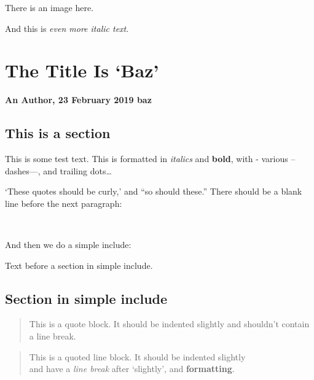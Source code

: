 \documentclass[
  12pt,
  a4paper,
]{article}
\begin{document}
\makeatletter
\@afterindentfalse
\@afterheading
\makeatother

There is an image here.

And this is \emph{even more italic text}.

\hypertarget{__h1_3}{%
\section{The Title Is `Baz'}\label{__h1_3}}

\makeatletter
\@afterindentfalse
\@afterheading
\makeatother

\textbf{An Author, 23 February 2019 baz}

\hypertarget{__h2_4}{%
\subsection{This is a section}\label{__h2_4}}

\makeatletter
\@afterindentfalse
\@afterheading
\makeatother

This is some test text. This is formatted in \emph{italics} and
\textbf{bold}, with - various -- dashes---, and trailing dots\ldots{}

`These quotes should be curly,' and ``so should these.'' There should be
a blank line before the next paragraph:

~

\makeatletter
\@afterindentfalse
\@afterheading
\makeatother

And then we do a simple include:

Text before a section in simple include.

\hypertarget{__h2_5}{%
\subsection{Section in simple include}\label{__h2_5}}

\begin{quote}
This is a quote block. It should be indented slightly and shouldn't
contain a line break.
\end{quote}

\begin{quote}
This is a quoted line block. It should be indented slightly\\
and have a \emph{line break} after `slightly', and \textbf{formatting}.
\end{quote}

\makeatletter
\@afterindentfalse
\@afterheading
\makeatother
\end{document}
